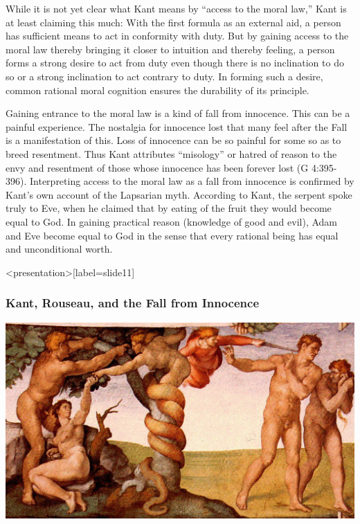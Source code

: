 While it is not yet clear what Kant means by ``access to the moral law,'' Kant is at least claiming this much: With the first formula as an external aid, a person has sufficient means to act in conformity with duty. But by gaining access to the moral law thereby bringing it closer to intuition and thereby feeling, a person forms a strong desire to act from duty even though there is no inclination to do so or a strong inclination to act contrary to duty. In forming such a desire, common rational moral cognition ensures the durability of its principle.

Gaining entrance to the moral law is a kind of fall from innocence. This can be a painful experience. The nostalgia for innocence lost that many feel after the Fall is a manifestation of this. Loss of innocence can be so painful for some so as to breed resentment. Thus Kant attributes ``misology'' or hatred of reason to the envy and resentment of those whose innocence has been forever lost (G 4:395-396). Interpreting access to the moral law as a fall from innocence is confirmed by Kant's own account of the Lapsarian myth. According to Kant, the serpent spoke truly to Eve, when he claimed that by eating of the fruit they would become equal to God. In gaining practical reason (knowledge of good and evil), Adam and Eve become equal to God in the sense that every rational being has equal and unconditional worth. \change

% 


\begin{frame}<presentation>[label=slide11]
    \frametitle{Kant, Rouseau, and the Fall from Innocence}
        \includegraphics[width=\textwidth]{../../../graphics/the_fall.jpg}
\end{frame}

